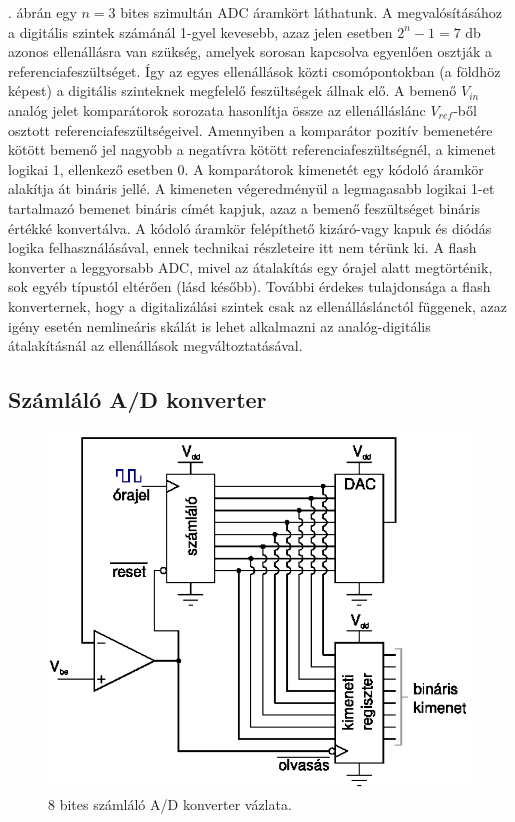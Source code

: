 \documentclass[12pt]{article}
\theoremstyle{plain}
\begin{document}
. ábrán egy $n=3$ bites szimultán ADC áramkört láthatunk. A megvalósításához a digitális szintek számánál 1-gyel kevesebb, azaz jelen esetben $2^n - 1 = 7$ db azonos ellenállásra van szükség, amelyek sorosan kapcsolva egyenlően osztják a referenciafeszültséget. Így az egyes ellenállások közti csomópontokban (a földhöz képest) a digitális szinteknek megfelelő feszültségek állnak elő. A bemenő $V_{in}$ analóg jelet komparátorok sorozata hasonlítja össze az ellenálláslánc $V_{ref}$-ből osztott referenciafeszültségeivel. Amennyiben a komparátor pozitív bemenetére kötött bemenő jel nagyobb a negatívra kötött referenciafeszültségnél, a kimenet logikai 1, ellenkező esetben 0. A komparátorok kimenetét egy kódoló áramkör alakítja át bináris jellé. A kimeneten végeredményül a legmagasabb logikai 1-et tartalmazó bemenet bináris címét kapjuk, azaz a bemenő feszültséget bináris értékké konvertálva. A kódoló áramkör felépíthető kizáró-vagy kapuk és diódás logika felhasználásával, ennek technikai részleteire itt nem térünk ki. A flash konverter a leggyorsabb ADC, mivel az átalakítás egy órajel alatt megtörténik, sok egyéb típustól eltérően (lásd később). További érdekes tulajdonsága a flash konverternek, hogy a digitalizálási szintek csak az ellenálláslánctól függenek, azaz igény esetén nemlineáris skálát is lehet alkalmazni az analóg-digitális átalakításnál az ellenállások megváltoztatásával.



\subsection{Számláló A/D konverter}

\begin{figure}[]
	\centering
	\includegraphics[width=0.7\linewidth]{media/ADC_szamlalo}
	\caption{8 bites számláló A/D konverter vázlata.}
	\label{fig:adcszamlalo}
\end{figure}
\end{document}
